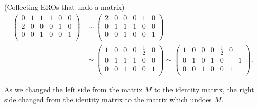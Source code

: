 \begin{example} \label{undo_a_matrix}(Collecting EROs that \hypertarget{undo a matrix}{undo a matrix})
\begin{align*}
\left(\begin{array}{ccc|ccc}
0 & 1 & 1 &1 &0 &0\\ 
2 & 0 & 0 &0&1&0\\
0& 0 & 1   &0  &0 &1\\
\end{array}  \right)
&\!\!\sim
\left(\begin{array}{ccc|ccc}
2 & 0 & 0 &0&1&0\\
0 & 1 & 1 &1 &0 &0\\ 
0& 0 & 1   &0  &0 &1\\
\end{array}  \right)
\\[2mm]
&\!\!\sim
\left(\begin{array}{ccc|ccc}
1 & 0 & 0 &0&\frac12&0\\
0 & 1 & 1 &1 &0 &0\\ 
0& 0 & 1   &0  &0 &1\\
\end{array}  \right)
\sim
\left(\begin{array}{ccc|ccr}
1 & 0 & 0 &0&\frac12&0\\
0 & 1 & 0 &1 &0 &\!\!\!-1\\ 
0& 0 & 1   &0  &0 &1\\
\end{array}  \right)\, .
\end{align*}
\end{example}
\noindent
As we changed the left side from the matrix $M$ to the identity matrix, the right side changed from the identity matrix to the matrix which undoes $M$. 
